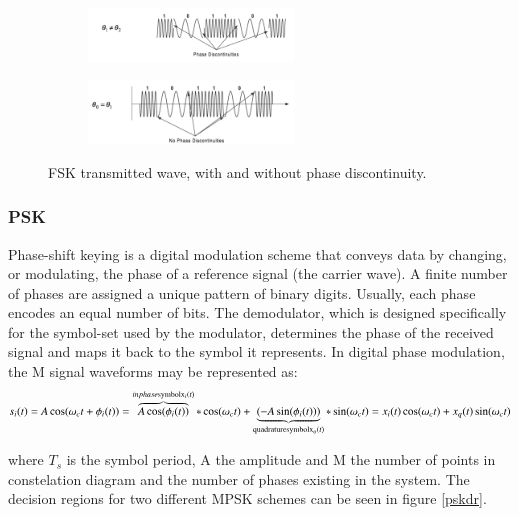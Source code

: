 \documentclass[12pt,a4paper,openright]{article}
\begin{document}
 \begin{figure}[h]
 \centering
\begin{subfigure}[h]{0.9\textwidth}
 \centering
    \includegraphics[width=0.6\textwidth]{ncpfsk.pdf}
    \label{coherent}

\end{subfigure}
\quad

\begin{subfigure}[h]{0.9\textwidth}
 \centering
    \includegraphics[width=0.6\textwidth]{cpfsk.pdf}
    \label{noncoherent}
    \end{subfigure}
    \caption{FSK transmitted wave, with and without phase discontinuity.}
    \label{comparecpfsk}
\end{figure}


\subsubsection{PSK}

Phase-shift keying is a digital modulation scheme that conveys data by changing, or modulating, the phase of a reference signal (the carrier wave). A finite number of phases are assigned a unique pattern of binary digits. Usually, each phase encodes an equal number of bits. The demodulator, which is designed specifically for the symbol-set used by the modulator, determines the phase of the received signal and maps it back to the symbol it represents. In digital phase modulation, the M signal waveforms may be represented as: 
\[{s_i}(t) = A\cos ({\omega _c}t + {\phi _i}(t)) = \overbrace {A\cos ({\phi _i}(t))}^{inphase{\rm{ symbol }}{{\rm{x}}_i}(t)}*\cos ({\omega _c}t) + \underbrace {( - A\sin ({\phi _i}(t)))}_{{\rm{quadrature symbol }}{{\rm{x}}_q}(t)}*\sin ({\omega _c}t) = {x_i}(t)\cos ({\omega _c}t) + {x_q}(t)\sin ({\omega _c}t)\]

where $T_s$ is the symbol period, A the amplitude and M the number of points in constelation diagram and the number of phases existing in the system. The decision regions for two different MPSK schemes can be seen in figure \ref{pskdr}.
\end{document}
